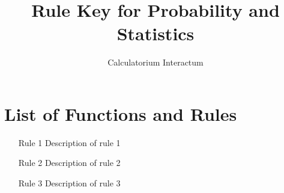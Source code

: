 \documentclass{article}
\title{Rule Key for Probability and Statistics}
\author{Calculatorium Interactum}
\begin{document}
\maketitle

\section{List of Functions and Rules}

\begin{enumerate}
    \item [Rule 1] Description of rule 1
    \item [Rule 2] Description of rule 2
    \item [Rule 3] Description of rule 3
\end{enumerate}
\end{document}
